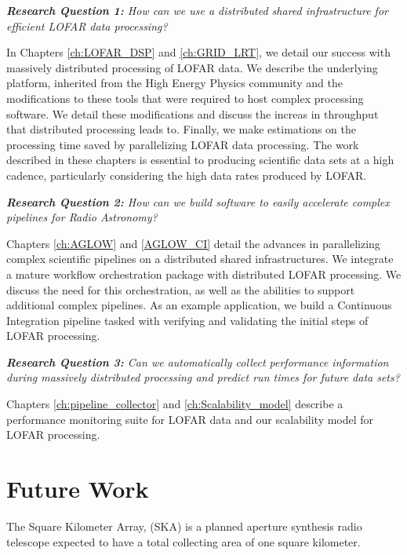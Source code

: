 \begin{addmargin}[4em]{8em}%
    \emph{\textbf{Research Question 1:} How can we use a distributed shared infrastructure for efficient LOFAR data processing?}
\end{addmargin}

In Chapters \ref{ch:LOFAR_DSP} and \ref{ch:GRID_LRT}, we detail our success with massively distributed processing of LOFAR data. We describe the underlying platform, inherited from the High Energy Physics community and the modifications to these tools that were required to host complex processing software. We detail these modifications and discuss the increas in throughput that distributed processing leads to. Finally, we make estimations on the processing time saved by parallelizing LOFAR data processing. The work described in these chapters is essential to producing scientific data sets at a high cadence, particularly considering the high data rates produced by LOFAR.  


\begin{addmargin}[4em]{8em}%
    \emph{\textbf{Research Question 2:} How can we build software to easily accelerate complex pipelines for Radio Astronomy?}
\end{addmargin}

Chapters \ref{ch:AGLOW} and \ref{AGLOW_CI} detail the advances in parallelizing complex scientific pipelines on a distributed shared infrastructures. We integrate a mature workflow orchestration package with distributed LOFAR processing. We discuss the need for this orchestration, as well as the abilities to support additional complex pipelines. As an example application, we build a Continuous Integration pipeline tasked with verifying and validating the initial steps of LOFAR processing. 


\begin{addmargin}[4em]{8em}%
    \emph{\textbf{Research Question 3:} Can we automatically collect performance information during massively distributed processing and predict run times for future data sets?}
\end{addmargin}

Chapters \ref{ch:pipeline_collector} and \ref{ch:Scalability_model} describe a performance monitoring suite for LOFAR data and our scalability  model for LOFAR processing. 


\section{Future Work}

The Square Kilometer Array, (SKA) is a planned aperture synthesis radio telescope expected to have a total collecting area of one square kilometer.  
